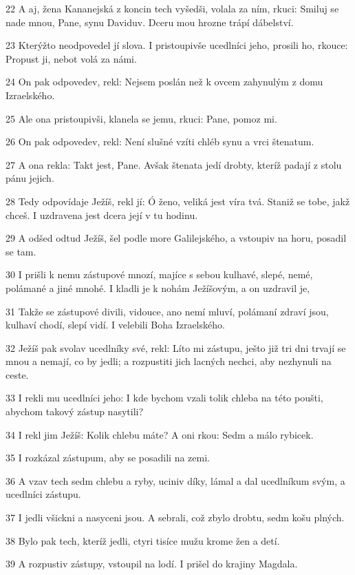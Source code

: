 \par 22 A aj, žena Kananejská z koncin tech vyšedši, volala za ním, rkuci: Smiluj se nade mnou, Pane, synu Daviduv. Dceru mou hrozne trápí dábelství.
\par 23 Kterýžto neodpovedel jí slova. I pristoupivše ucedlníci jeho, prosili ho, rkouce: Propust ji, nebot volá za námi.
\par 24 On pak odpovedev, rekl: Nejsem poslán než k ovcem zahynulým z domu Izraelského.
\par 25 Ale ona pristoupivši, klanela se jemu, rkuci: Pane, pomoz mi.
\par 26 On pak odpovedev, rekl: Není slušné vzíti chléb synu a vrci štenatum.
\par 27 A ona rekla: Takt jest, Pane. Avšak štenata jedí drobty, kteríž padají z stolu pánu jejich.
\par 28 Tedy odpovídaje Ježíš, rekl jí: Ó ženo, veliká jest víra tvá. Staniž se tobe, jakž chceš. I uzdravena jest dcera její v tu hodinu.
\par 29 A odšed odtud Ježíš, šel podle more Galilejského, a vstoupiv na horu, posadil se tam.
\par 30 I prišli k nemu zástupové mnozí, majíce s sebou kulhavé, slepé, nemé, polámané a jiné mnohé. I kladli je k nohám Ježíšovým, a on uzdravil je,
\par 31 Takže se zástupové divili, vidouce, ano nemí mluví, polámaní zdraví jsou, kulhaví chodí, slepí vidí. I velebili Boha Izraelského.
\par 32 Ježíš pak svolav ucedlníky své, rekl: Líto mi zástupu, ješto již tri dni trvají se mnou a nemají, co by jedli; a rozpustiti jich lacných nechci, aby nezhynuli na ceste.
\par 33 I rekli mu ucedlníci jeho: I kde bychom vzali tolik chleba na této poušti, abychom takový zástup nasytili?
\par 34 I rekl jim Ježíš: Kolik chlebu máte? A oni rkou: Sedm a málo rybicek.
\par 35 I rozkázal zástupum, aby se posadili na zemi.
\par 36 A vzav tech sedm chlebu a ryby, uciniv díky, lámal a dal ucedlníkum svým, a ucedlníci zástupu.
\par 37 I jedli všickni a nasyceni jsou. A sebrali, což zbylo drobtu, sedm košu plných.
\par 38 Bylo pak tech, kteríž jedli, ctyri tisíce mužu krome žen a detí.
\par 39 A rozpustiv zástupy, vstoupil na lodí. I prišel do krajiny Magdala.

